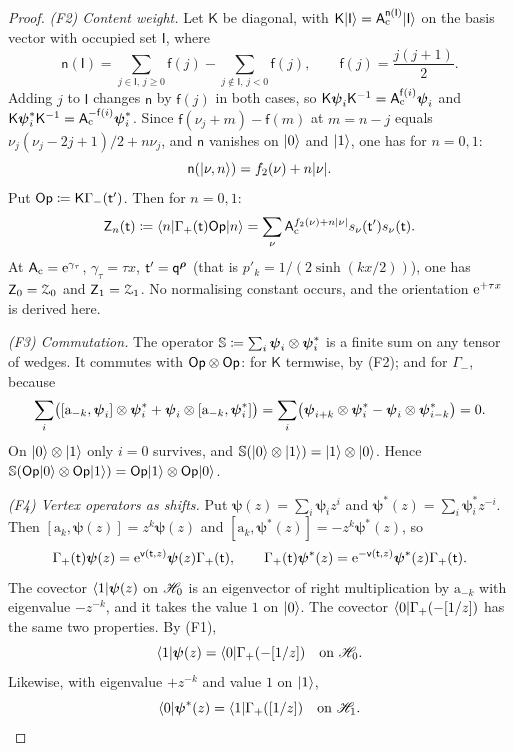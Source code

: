 \begin{proof}
\emph{(F2) Content weight.} Let $\mathsf{K}$ be diagonal, with $\mathsf{K}\lvert \mathsf{I}\rangle=\mathsf{A}_{\mathrm{c}}^{\mathsf{n}(\mathsf{I})}\lvert \mathsf{I}\rangle$ on the basis vector with occupied set $\mathsf{I}$, where
\[
\mathsf{n}(\mathsf{I})=\sum_{j\in\mathsf{I},\,j\geq 0}\mathsf{f}(j)-\sum_{j\notin\mathsf{I},\,j<0}\mathsf{f}(j),\qquad\mathsf{f}(j)=\frac{j(j+1)}{2}.
\]
Adding $j$ to $\mathsf{I}$ changes $\mathsf{n}$ by $\mathsf{f}(j)$ in both cases, so $\mathsf{K}\boldsymbol{\psi}_i\mathsf{K}^{-1}=\mathsf{A}_{\mathrm{c}}^{\mathsf{f}(i)}\boldsymbol{\psi}_i$ and $\mathsf{K}\boldsymbol{\psi}^*_i\mathsf{K}^{-1}=\mathsf{A}_{\mathrm{c}}^{-\mathsf{f}(i)}\boldsymbol{\psi}^*_i$. Since $\mathsf{f}(\nu_j+m)-\mathsf{f}(m)$ at $m=n-j$ equals $\nu_j(\nu_j-2j+1)/2+n\nu_j$, and $\mathsf{n}$ vanishes on $\lvert 0\rangle$ and $\lvert 1\rangle$, one has for $n=0,1$:
\[
\mathsf{n}(\lvert \nu,n\rangle)=f_2(\nu)+n\lvert\nu\rvert.
\]
Put $\mathsf{Op}\coloneqq\mathsf{K}\Gamma_-(\mathsf{t}')$. Then for $n=0,1$:
\[
\mathsf{Z}_n(\mathsf{t})\coloneqq\langle n\rvert\Gamma_+(\mathsf{t})\mathsf{Op}\lvert n\rangle=\sum_\nu\mathsf{A}_{\mathrm{c}}^{f_2(\nu)+n\lvert\nu\rvert}s_\nu(\mathsf{t}')s_\nu(\mathsf{t}).
\]
At $\mathsf{A}_{\mathrm{c}}=\mathrm{e}^{\gamma_\tau}$, $\gamma_\tau=\tau x$, $\mathsf{t}'=\mathsf{q}^{\boldsymbol{\rho}}$ (that is $p'_k=1/(2\sinh(kx/2))$), one has $\mathsf{Z}_0=\mathcal{Z}_0$ and $\mathsf{Z}_1=\mathcal{Z}_1$. No normalising constant occurs, and the orientation $\mathrm{e}^{+\tau x}$ is derived here.

\emph{(F3) Commutation.} The operator $\mathbb{S}\coloneqq\sum_i\boldsymbol{\psi}_i\otimes\boldsymbol{\psi}^*_i$ is a finite sum on any tensor of wedges. It commutes with $\mathsf{Op}\otimes\mathsf{Op}$: for $\mathsf{K}$ termwise, by (F2); and for $\Gamma_-$, because
\[
\sum_i\bigl([\mathrm{a}_{-k},\boldsymbol{\psi}_i]\otimes\boldsymbol{\psi}^*_i+\boldsymbol{\psi}_i\otimes[\mathrm{a}_{-k},\boldsymbol{\psi}^*_i]\bigr)=\sum_i\bigl(\boldsymbol{\psi}_{i+k}\otimes\boldsymbol{\psi}^*_i-\boldsymbol{\psi}_i\otimes\boldsymbol{\psi}^*_{i-k}\bigr)=0.
\]
On $\lvert 0\rangle\otimes\lvert 1\rangle$ only $i=0$ survives, and $\mathbb{S}(\lvert 0\rangle\otimes\lvert 1\rangle)=\lvert 1\rangle\otimes\lvert 0\rangle$. Hence $\mathbb{S}(\mathsf{Op}\lvert 0\rangle\otimes\mathsf{Op}\lvert 1\rangle)=\mathsf{Op}\lvert 1\rangle\otimes\mathsf{Op}\lvert 0\rangle$.

\emph{(F4) Vertex operators as shifts.} Put $\boldsymbol{\psi}(z)=\sum_i\boldsymbol{\psi}_iz^i$ and $\boldsymbol{\psi}^*(z)=\sum_i\boldsymbol{\psi}^*_iz^{-i}$. Then $[\mathrm{a}_k,\boldsymbol{\psi}(z)]=z^k\boldsymbol{\psi}(z)$ and $[\mathrm{a}_k,\boldsymbol{\psi}^*(z)]=-z^k\boldsymbol{\psi}^*(z)$, so
\[
\Gamma_+(\mathsf{t})\boldsymbol{\psi}(z)=\mathrm{e}^{\mathsf{v}(\mathsf{t},z)}\boldsymbol{\psi}(z)\Gamma_+(\mathsf{t}),\qquad\Gamma_+(\mathsf{t})\boldsymbol{\psi}^*(z)=\mathrm{e}^{-\mathsf{v}(\mathsf{t},z)}\boldsymbol{\psi}^*(z)\Gamma_+(\mathsf{t}).
\]
The covector $\langle 1\rvert\boldsymbol{\psi}(z)$ on $\mathscr{H}_0$ is an eigenvector of right multiplication by $\mathrm{a}_{-k}$ with eigenvalue $-z^{-k}$, and it takes the value $1$ on $\lvert 0\rangle$. The covector $\langle 0\rvert\Gamma_+(-[1/z])$ has the same two properties. By (F1),
\[
\langle 1\rvert\boldsymbol{\psi}(z)=\langle 0\rvert\Gamma_+(-[1/z])\quad\text{on }\mathscr{H}_0.
\]
Likewise, with eigenvalue $+z^{-k}$ and value $1$ on $\lvert 1\rangle$,
\[
\langle 0\rvert\boldsymbol{\psi}^*(z)=\langle 1\rvert\Gamma_+([1/z])\quad\text{on }\mathscr{H}_1.
\]


\end{proof}
